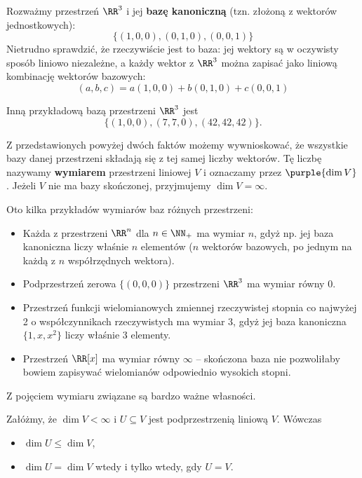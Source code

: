 \begin{example}
    Rozważmy przestrzeń $\RR^3$ i jej \textbf{bazę kanoniczną} (tzn. złożoną z wektorów jednostkowych):
    $$\{(1, 0, 0), (0, 1, 0), (0, 0, 1)\}$$
   	Nietrudno sprawdzić, że rzeczywiście jest to baza: jej wektory są w oczywisty sposób liniowo niezależne, a każdy wektor z $\RR^3$ można zapisać jako liniową kombinację wektorów bazowych:
   	$$(a, b, c) = a(1, 0, 0) + b(0, 1, 0) + c(0, 0, 1)$$
   	
   	Inną przykładową bazą przestrzeni $\RR^3$ jest
   	$$\{(1, 0, 0), (7, 7, 0), (42, 42, 42)\}.$$
\end{example}

Z przedstawionych powyżej dwóch faktów możemy wywnioskować, że wszystkie bazy danej przestrzeni składają się z tej samej liczby wektorów. Tę liczbę nazywamy \textbf{wymiarem} przestrzeni liniowej $V$ i oznaczamy przez $\purple{\dim V}$. Jeżeli $V$ nie ma bazy skończonej, przyjmujemy $\dim V = \infty$.

\begin{example}
    Oto kilka przykładów wymiarów baz różnych przestrzeni:
    \begin{itemize}
    	\item Każda z przestrzeni $\RR^n$ dla $n \in \NN_+$ ma wymiar $n$, gdyż np. jej baza kanoniczna liczy właśnie $n$ elementów ($n$ wektorów bazowych, po jednym na każdą z $n$ współrzędnych wektora).
    	
    	\item Podprzestrzeń zerowa $\{(0, 0, 0)\}$ przestrzeni $\RR^3$ ma wymiar równy 0.
    	
    	\item Przestrzeń funkcji wielomianowych zmiennej rzeczywistej stopnia co najwyżej 2 o współczynnikach rzeczywistych ma wymiar 3, gdyż jej baza kanoniczna $\{1, x, x^2\}$ liczy właśnie 3 elementy.
    	
    	\item Przestrzeń $\RR[x]$ ma wymiar równy $\infty$ -- skończona baza nie pozwoliłaby bowiem zapisywać wielomianów odpowiednio wysokich stopni.
    \end{itemize}
\end{example}

Z pojęciem wymiaru związane są bardzo ważne własności.

Załóżmy, że $\dim{V} < \infty$ i $U \subseteq V$ jest podprzestrzenią liniową $V$. Wówczas
\begin{itemize}
	\item $\dim{U} \leq \dim{V}$,
	\item $\dim{U} = \dim{V}$ wtedy i tylko wtedy, gdy $U = V$.
\end{itemize}

